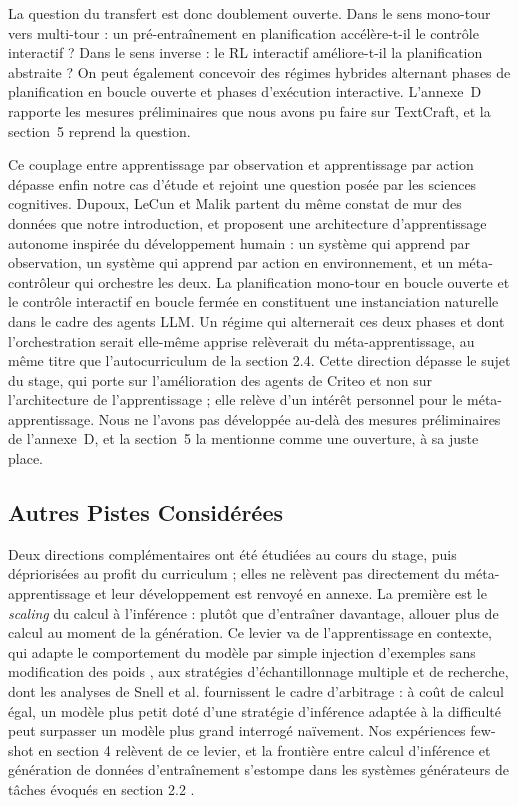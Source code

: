 \documentclass[11pt,a4paper]{article}
\begin{document}
La question du transfert est donc doublement ouverte. Dans le sens mono-tour vers multi-tour : un pré-entraînement en planification accélère-t-il le contrôle interactif ? Dans le sens inverse : le RL interactif améliore-t-il la planification abstraite ? On peut également concevoir des régimes hybrides alternant phases de planification en boucle ouverte et phases d'exécution interactive. L'annexe~D rapporte les mesures préliminaires que nous avons pu faire sur TextCraft, et la section~5 reprend la question.


Ce couplage entre apprentissage par observation et apprentissage par action dépasse enfin notre cas d'étude et rejoint une question posée par les sciences cognitives. Dupoux, LeCun et Malik \cite{dupoux2026why} partent du même constat de mur des données que notre introduction, et proposent une architecture d'apprentissage autonome inspirée du développement humain : un système qui apprend par observation, un système qui apprend par action en environnement, et un méta-contrôleur qui orchestre les deux. La planification mono-tour en boucle ouverte et le contrôle interactif en boucle fermée en constituent une instanciation naturelle dans le cadre des agents LLM. Un régime qui alternerait ces deux phases et dont l'orchestration serait elle-même apprise relèverait du méta-apprentissage, au même titre que l'autocurriculum de la section 2.4. Cette direction dépasse le sujet du stage, qui porte sur l'amélioration des agents de Criteo et non sur l'architecture de l'apprentissage ; elle relève d'un intérêt personnel pour le méta-apprentissage. Nous ne l'avons pas développée au-delà des mesures préliminaires de l'annexe~D, et la section~5 la mentionne comme une ouverture, à sa juste place.


\subsection{Autres Pistes Considérées}

Deux directions complémentaires ont été étudiées au cours du stage, puis dépriorisées au profit du curriculum ; elles ne relèvent pas directement du méta-apprentissage et leur développement est renvoyé en annexe. La première est le \emph{scaling} du calcul à l'inférence : plutôt que d'entraîner davantage, allouer plus de calcul au moment de la génération. Ce levier va de l'apprentissage en contexte, qui adapte le comportement du modèle par simple injection d'exemples sans modification des poids \cite{brown2020gpt3}, aux stratégies d'échantillonnage multiple et de recherche, dont les analyses de Snell et al. \cite{snell2024scaling} fournissent le cadre d'arbitrage : à coût de calcul égal, un modèle plus petit doté d'une stratégie d'inférence adaptée à la difficulté peut surpasser un modèle plus grand interrogé naïvement. Nos expériences few-shot en section 4 relèvent de ce levier, et la frontière entre calcul d'inférence et génération de données d'entraînement s'estompe dans les systèmes générateurs de tâches évoqués en section 2.2 \cite{zhou2025sca, dreamgym2025}.
\end{document}
